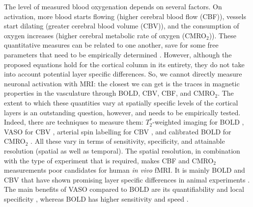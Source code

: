 The level of measured blood oxygenation depends on several factors. On activation, more blood starts flowing (higher cerebral blood flow (CBF)), vessels start dilating (greater cerebral blood volume (CBV)), and the consumption of oxygen increases (higher cerebral metabolic rate of oxygen (CMRO$_{2}$)). These quantitative measures can be related to one another, save for some free parameters that need to be empirically determined \cite{Davis1997}. However, although the proposed equations hold for the cortical column in its entirety, they do not take into account potential layer specific differences. So, we cannot directly measure neuronal activation with MRI: the closest we can get is the traces in magnetic properties in the vasculature through BOLD, CBV, CBF, and CMRO$_{2}$. The extent to which these quantities vary at spatially specific levels of the cortical layers is an outstanding question, however, and needs to be empirically tested. Indeed, there are techniques to measure them: $T_2^*$-weighted imaging for BOLD \cite{Norris2006}, VASO for CBV \cite{Huber2018}, arterial spin labelling for CBV \cite{Grade2015}, and calibrated BOLD for CMRO$_{2}$ \cite{Blockley2013}. All these vary in terms of sensitivity, specificity, and attainable resolution (spatial as well as temporal). The spatial resolution, in combination with the type of experiment that is required, makes CBF and CMRO$_2$ measurements poor candidates for human \emph{in vivo} fMRI. It is mainly BOLD and CBV that have shown promising layer specific differences in animal experiments \cite{Lu2004,Zhao2006,Jin2008,Goense2012}. The main benefits of VASO compared to BOLD are its quantifiability \cite{Lu2003} and local specificity \cite{Jin2006}, whereas BOLD has higher sensitivity and speed \cite{Huber2018}.

